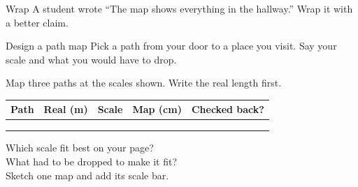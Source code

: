 \begin{puzzle}{Wrap}
A student wrote ``The map shows everything in the hallway.'' Wrap it with a better claim. \wline[6cm]
\end{puzzle}

\begin{puzzle}{Design a path map}
Pick a path from your door to a place you visit. Say your scale and what you would have to drop. \wline[6cm]
\end{puzzle}
\clearpage

\thispagestyle{fancy}
Map three paths at the scales shown. Write the real length first.\par\medskip
\renewcommand{\arraystretch}{3.0}
\begin{tabularx}{\linewidth}{|>{\sffamily\small\bfseries}p{2.6cm}|X|X|X|X|}
\hline
Path & Real (m) & Scale & Map (cm) & Checked back? \\ \hline
 & & & & \\ \hline
 & & & & \\ \hline
 & & & & \\ \hline
\end{tabularx}

\vspace{8pt}
Which scale fit best on your page? \wline[7cm]\\[10pt]
What had to be dropped to make it fit? \wline[5cm]\\[10pt]
Sketch one map and add its scale bar.\par\medskip
{}
\clearpage
